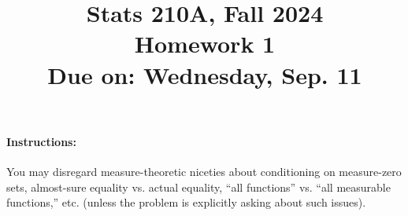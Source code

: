 \documentclass{article}
\theoremstyle{definition}
\begin{document}
\title{Stats 210A, Fall 2024\\
  Homework 1 \\
  {\large {\bf Due on}: Wednesday, Sep. 11}}
\date{}

\maketitle

\paragraph{Instructions:} You may disregard measure-theoretic niceties about conditioning on measure-zero sets, almost-sure equality vs. actual equality, ``all functions'' vs. ``all measurable functions,'' etc. (unless the problem is explicitly asking about such issues).
\end{document}
